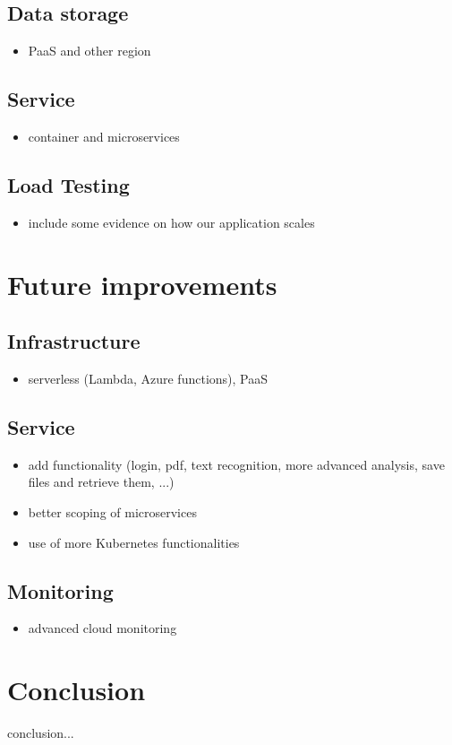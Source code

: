 \documentclass[conference]{IEEEtran}
\begin{document}
\subsection{Data storage}
\begin{itemize}
	\item PaaS and other region
\end{itemize}

\subsection{Service}
\begin{itemize}
	\item container and microservices
\end{itemize}

\subsection{Load Testing}
\begin{itemize}
	\item include some evidence on how our application scales
\end{itemize}

\section{Future improvements}
\subsection{Infrastructure}
\begin{itemize}
	\item serverless (Lambda, Azure functions),  PaaS
\end{itemize}

\subsection{Service}
\begin{itemize}
	\item add functionality (login, pdf, text recognition, more advanced analysis, save files and retrieve them, ...)
	\item better scoping of microservices
	\item use of more Kubernetes functionalities
\end{itemize}

\subsection{Monitoring}
\begin{itemize}
	\item advanced cloud monitoring
\end{itemize}

\section{Conclusion}
conclusion...




\end{document}
